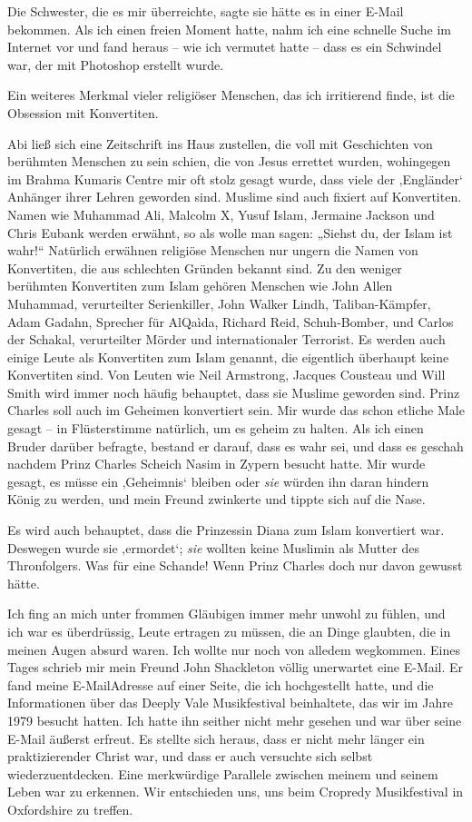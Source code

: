 \documentclass[12pt]{memoir}
\begin{document}
Die Schwester, die es mir überreichte,
sagte sie hätte es in einer E-Mail bekommen.
Als ich einen freien Moment hatte,
nahm ich eine schnelle Suche im Internet vor und fand heraus –
wie ich vermutet hatte – dass es ein Schwindel war,
der mit Photoshop erstellt wurde.

Ein weiteres Merkmal vieler religiöser Menschen,
das ich irritierend finde, ist die Obsession mit Konvertiten.

Abi ließ sich eine Zeitschrift ins Haus zustellen,
die voll mit Geschichten von berühmten Menschen zu sein schien,
die von Jesus errettet wurden,
wohingegen im Brahma Kumaris Centre mir oft stolz gesagt wurde,
dass viele der ‚Engländer‘ Anhänger ihrer Lehren geworden sind.
Muslime sind auch fixiert auf Konvertiten.
Namen wie Muhammad Ali, Malcolm X, Yusuf Islam,
Jermaine Jackson und Chris Eubank werden erwähnt,
so als wolle man sagen: „Siehst du, der Islam ist wahr!“
Natürlich erwähnen religiöse Menschen nur ungern die Namen von Konvertiten,
die aus schlechten Gründen bekannt sind.
Zu den weniger berühmten Konvertiten zum Islam gehören Menschen
wie John Allen Muhammad, verurteilter Serienkiller, John Walker Lindh,
Taliban-Kämpfer, Adam Gadahn, Sprecher für Al\–Qa\`ida,
Richard Reid, Schuh-Bomber, und Carlos der Schakal,
verurteilter Mörder und internationaler Terrorist.
Es werden auch einige Leute als Konvertiten zum Islam genannt,
die eigentlich überhaupt keine Konvertiten sind.
Von Leuten wie Neil Armstrong, Jacques Cousteau und Will Smith
wird immer noch häufig behauptet, dass sie Muslime geworden sind.
Prinz Charles soll auch im Geheimen konvertiert sein.
Mir wurde das schon etliche Male gesagt –
in Flüsterstimme natürlich, um es geheim zu halten.
Als ich einen Bruder darüber befragte, bestand er darauf,
dass es wahr sei, und dass es geschah nachdem Prinz Charles
Scheich Nasim in Zypern besucht hatte.
Mir wurde gesagt, es müsse ein ‚Geheimnis‘ bleiben
oder \emph{sie} würden ihn daran hindern König zu werden,
und mein Freund zwinkerte und tippte sich auf die Nase.

Es wird auch behauptet, dass die Prinzessin Diana zum Islam konvertiert war.
Deswegen wurde sie ‚ermordet‘;
\emph{sie} wollten keine Muslimin als Mutter des Thronfolgers.
Was für eine Schande! Wenn Prinz Charles doch nur davon gewusst hätte.

Ich fing an mich unter frommen Gläubigen immer mehr unwohl zu fühlen,
und ich war es überdrüssig, Leute ertragen zu müssen,
die an Dinge glaubten, die in meinen Augen absurd waren.
Ich wollte nur noch von alledem wegkommen.
Eines Tages schrieb mir mein Freund John Shackleton
völlig unerwartet eine E-Mail.
Er fand meine E-Mail\–Adresse auf einer Seite,
die ich hochgestellt hatte, und die Informationen über das Deeply Vale Musikfestival beinhaltete, das wir im Jahre 1979 besucht hatten.
Ich hatte ihn seither nicht mehr gesehen
und war über seine E-Mail äußerst erfreut.
Es stellte sich heraus,
dass er nicht mehr länger ein praktizierender Christ war,
und dass er auch versuchte sich selbst wiederzuentdecken.
Eine merkwürdige Parallele zwischen meinem und seinem Leben war zu erkennen.
Wir entschieden uns, uns beim Cropredy Musikfestival in Oxfordshire zu treffen.
\end{document}
